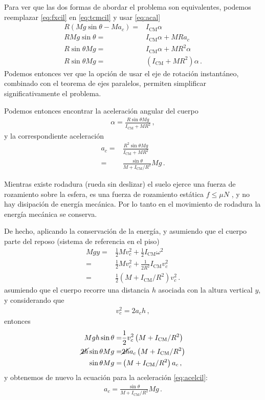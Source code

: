 Para ver que las dos formas de abordar el problema son equivalentes, podemos reemplazar \eqref{eq:fxcil} en \eqref{eq:tcmcil} y usar \eqref{eq:acal} 
\begin{align*}
  R(Mg\sin\theta-M a_c)=&I_{\text{CM}}\alpha\nonumber\\
  RMg\sin\theta=&I_{\text{CM}}\alpha+M R a_c\nonumber\\
  R\sin\theta Mg=&I_{\text{CM}}\alpha+M R^2\alpha\nonumber\\
  R\sin\theta Mg=&(I_{\text{CM}}+M R^2)\alpha\,.
\end{align*}
Podemos entonces ver que la opción de usar el eje de rotación instantáneo, combinado con el teorema de ejes paralelos, permiten simplificar significativamente el problema.

Podemos entonces encontrar la aceleración angular del cuerpo
\begin{align}
  \alpha=\frac{R\sin\theta M g}{I_{\text{CM}}+MR^2}\,,
\end{align}
y la correspondiente aceleración
\begin{align}
  \label{eq:acelcil}
  a_c=&\frac{R^2\sin\theta M g}{I_{\text{CM}}+MR^2}\nonumber\\
  =&\frac{\sin\theta }{M+I_{\text{CM}}/R^2}M g\,.
\end{align}


Mientras existe rodadura (rueda sin deslizar) el suelo ejerce una
fuerza de rozamiento sobre la esfera, es una fuerza de rozamiento
estática $f \le\mu N$ , y no hay disipación de energía mecánica. 
Por lo tanto en el movimiento de rodadura la energía mecánica se
conserva.

De hecho, aplicando la conservación de la energía, y asumiendo que el cuerpo parte del reposo (sistema de referencia en el piso)
\begin{align*}
  Mgy=&\frac{1}{2}Mv_c^2+\frac{1}{2}I_{\text{CM}}\omega^2\nonumber\\
  =&\frac{1}{2}Mv_c^2+\frac{1}{2R^2}I_{\text{CM}}v_c^2\nonumber\\
  =&\frac{1}{2}\left(M+I_{\text{CM}}/R^2\right)v_c^2\,.
\end{align*}
asumiendo que el cuerpo recorre una distancia $h$ asociada con la altura vertical $y$, y considerando que
\begin{align*}
  v_c^2=2a_c h\,,
\end{align*}
entonces
\begin{align*}
  Mgh\sin\theta=&\frac{1}{2}v_c^2\left(M+I_{\text{CM}}/R^2\right)\nonumber\\
  \cancel{2h}\sin\theta Mg=&\cancel{2h}a_c\left(M+I_{\text{CM}}/R^2\right)\nonumber\\
  \sin\theta Mg=&\left(M+I_{\text{CM}}/R^2\right)a_c\,,
\end{align*}
y obtenemos de nuevo la ecuación para la aceleración \eqref{eq:acelcil}:
\begin{align*}
  a_c=\frac{\sin\theta}{M+I_{\text{CM}}/R^2}Mg\,.
\end{align*}

